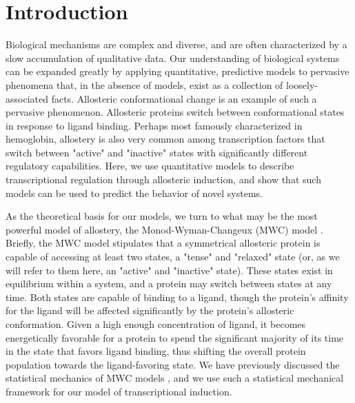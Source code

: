 \section*{Introduction }

Biological mechanisms are complex and diverse, and are often characterized by a slow accumulation of qualitative data. Our understanding of biological systems can be expanded greatly by applying quantitative, predictive models to pervasive phenomena that, in the absence of models, exist as a collection of loosely-associated facts. Allosteric conformational change is an example of such a pervasive phenomenon. Allosteric proteins switch between conformational states in response to ligand binding. Perhaps most famously characterized in hemoglobin, allostery is also very common among transcription factors that switch between "active" and "inactive" states with significantly different regulatory capabilities. Here, we use quantitative models to describe transcriptional regulation through allosteric induction, and show that such models can be used to predict the behavior of novel systems. 

As the theoretical basis for our models, we turn to what may be the most powerful model of allostery, the Monod-Wyman-Changeux (MWC) model \cite{MONOD1965}. Briefly, the MWC model stipulates that a symmetrical allosteric protein is capable of accessing at least two states, a "tense" and "relaxed" state (or, as we will refer to them here, an "active" and "inactive" state). These states exist in equilibrium within a system, and a protein may switch between states at any time. Both states are capable of binding to a ligand, though the protein's affinity for the ligand will be affected significantly by the protein's allosteric conformation. Given a high enough concentration of ligand, it becomes energetically favorable for a protein to spend the significant majority of its time in the state that favors ligand binding, thus shifting the overall protein population towards the ligand-favoring state. We have previously discussed the statistical mechanics of MWC models \cite{Marzen2013}, and we use such a statistical mechanical framework for our model of transcriptional induction. 


